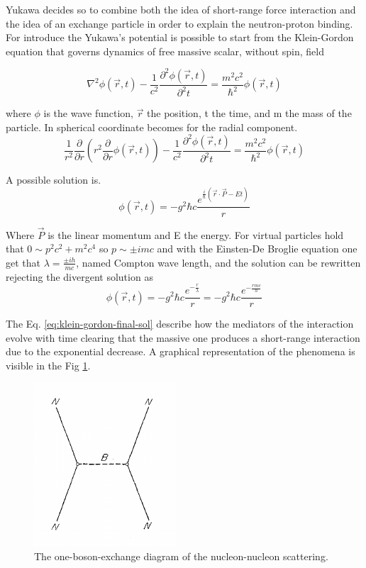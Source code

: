 \documentclass[12pt,a4paper]{book}
\begin{document}
	Yukawa decides so to combine both the idea of short-range force interaction and the idea of an exchange particle in order to explain the neutron-proton binding. For introduce the Yukawa's potential is possible to start from the Klein-Gordon equation that governs dynamics of free massive scalar, without spin, field
	
	\begin{equation}
		\nabla^2 \phi(\vec{r},t) - \frac{1}{c^2} \frac{\partial^2 \phi(\vec{r},t)}{\partial^2 t} = \frac{m^2 c^2}{\hbar^2} \phi(\vec{r},t)
		\label{eq:klein-gordon}
	\end{equation}
	
	where $\phi$ is the wave function, $\vec{r}$ the position, t the time, and m the mass of the particle. In spherical coordinate becomes for the radial component.
	\begin{equation}
		\frac{1}{r^2} \frac{\partial}{\partial r} (r^2 \frac{\partial}{\partial r} \phi(\vec{r},t)) - \frac{1}{c^2} \frac{\partial^2 \phi(\vec{r},t)}{\partial^2 t} = \frac{m^2 c^2}{\hbar^2} \phi(\vec{r},t)
		\label{eq:klein-gordon-spjericaò}
	\end{equation}
	
	A possible solution is.
	\begin{equation}
		\phi(\vec{r},t)= - g^2 \hbar c \frac{e^{\frac{i}{\hbar}(\vec{r} \cdot \vec{P}- E t)}}{r} 
		\label{eq:klein-gordon-sol}
	\end{equation}
	
	Where $\vec{P}$ is the linear momentum and E the energy. For virtual particles hold that $0 \sim p^2 c^2 + m^2 c^4$ so $p\sim \pm i m c$ and with the Einsten-De Broglie equation one get that $\lambda = \frac{\pm ih}{mc}$, named Compton wave length, and the solution can be rewritten rejecting the divergent solution as
	\begin{equation}
		\phi(\vec{r},t)= - g^2 \hbar c \frac{e^{-\frac{r}{\lambda}}}{r} = - g^2 \hbar c \frac{e^{-\frac{r mc}{h}}}{r}
		\label{eq:klein-gordon-final-sol}
	\end{equation}
	
	The Eq. \ref{eq:klein-gordon-final-sol} describe how the mediators of the interaction evolve with time clearing that the massive one produces a short-range interaction due to the exponential decrease. A graphical representation of the phenomena is visible in the Fig \ref{fig:one_boson_exchange}.
	\begin{figure}[ht]
		\centering
		\includegraphics[width=0.3\linewidth]{pictures/one_boson_exchange.png}
		\caption{The one-boson-exchange diagram of the nucleon-nucleon scattering.}
		\label{fig:one_boson_exchange} 
	\end{figure}
	
\end{document}
